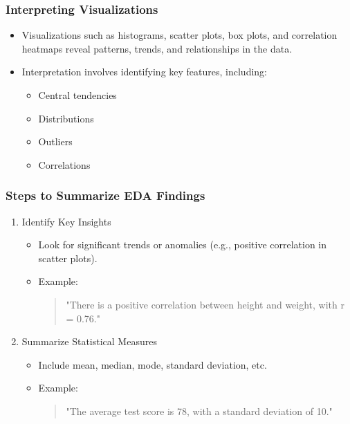 \documentclass[aspectratio=169]{beamer}
\begin{document}
\begin{frame}[fragile]
    \frametitle{Interpreting Visualizations}
    \begin{itemize}
        \item Visualizations such as histograms, scatter plots, box plots, and correlation heatmaps reveal patterns, trends, and relationships in the data.
        \item Interpretation involves identifying key features, including:
        \begin{itemize}
            \item Central tendencies
            \item Distributions
            \item Outliers
            \item Correlations
        \end{itemize}
    \end{itemize}
\end{frame}

\begin{frame}[fragile]
    \frametitle{Steps to Summarize EDA Findings}
    \begin{enumerate}
        \item Identify Key Insights
        \begin{itemize}
            \item Look for significant trends or anomalies (e.g., positive correlation in scatter plots).
            \item Example: 
            \begin{quote}
                "There is a positive correlation between height and weight, with r = 0.76."
            \end{quote}
        \end{itemize}

        \item Summarize Statistical Measures
        \begin{itemize}
            \item Include mean, median, mode, standard deviation, etc.
            \item Example: 
            \begin{quote}
                "The average test score is 78, with a standard deviation of 10."
            \end{quote}
        \end{itemize}
    \end{enumerate}
\end{frame}
\end{document}
